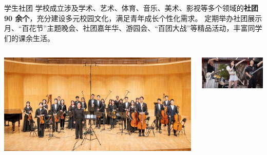 \documentclass[aspectratio=169, utf8]{beamer}
\begin{document}
\begin{frame}{学生社团}
    学校成立涉及学术、艺术、体育、音乐、美术、影视等多个领域的\textcolor{Fore}{\textbf{社团 90 余个}}，充分建设多元校园文化，满足青年成长个性化需求。
    定期举办社团展示月、“百花节”主题晚会、社团嘉年华、游园会、“百团大战”等精品活动，丰富同学们的课余生活。\\[1em]

    \begin{columns}
        \includegraphics[width=\textwidth]{./resources/25.jpg}

        \includegraphics[width=\textwidth]{./resources/26.jpg}
    \end{columns}
\end{frame}
\end{document}
